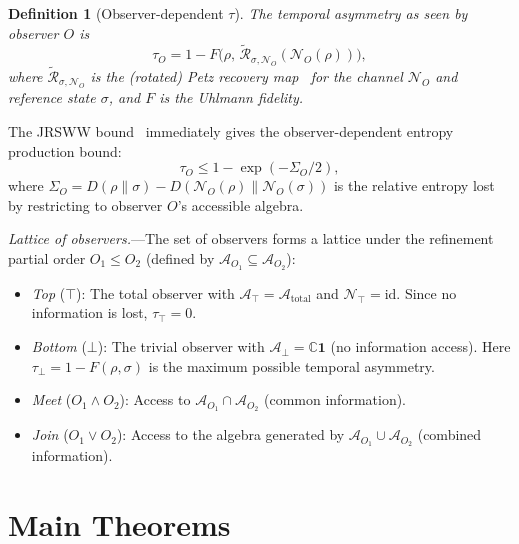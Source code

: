 \documentclass[prl,twocolumn,superscriptaddress,longbibliography,floatfix]{revtex4-2}
\newtheorem{definition}{Definition}
\newcommand{\id}{\mathrm{id}}
\newcommand{\Petz}{\mathcal{R}}
\newcommand{\chan}{\mathcal{N}}
\newcommand{\tauasym}{\tau}
\newcommand{\algO}{\mathcal{A}}
\begin{document}
\begin{definition}[Observer-dependent $\tauasym$]
\label{def:tau}
The \emph{temporal asymmetry as seen by observer $O$} is
\begin{equation}
\tauasym_O = 1 - F\!\big(\rho,\,
  \tilde{\Petz}_{\sigma,\chan_O}(\chan_O(\rho))\big),
\label{eq:tau_O}
\end{equation}
where $\tilde{\Petz}_{\sigma,\chan_O}$ is the (rotated) Petz
recovery map~\cite{Petz1988,Junge2018} for the channel $\chan_O$ and
reference state $\sigma$, and $F$ is the Uhlmann fidelity.
\end{definition}

The JRSWW bound~\cite{Junge2018} immediately gives the
observer-dependent entropy production bound:
\begin{equation}
\tauasym_O \leq 1 - \exp(-\Sigma_O/2),
\label{eq:tau_bound}
\end{equation}
where
$\Sigma_O = D(\rho\|\sigma) - D(\chan_O(\rho)\|\chan_O(\sigma))$
is the relative entropy lost by restricting to observer $O$'s
accessible algebra.

\emph{Lattice of observers.}---The set of observers forms a
lattice under the refinement partial order $O_1 \leq O_2$
(defined by $\algO_{O_1} \subseteq \algO_{O_2}$):
\begin{itemize}
\item \emph{Top} ($\top$): The total observer with
  $\algO_\top = \algO_{\mathrm{total}}$ and $\chan_\top = \id$.
  Since no information is lost, $\tauasym_\top = 0$.
\item \emph{Bottom} ($\bot$): The trivial observer with
  $\algO_\bot = \mathbb{C}\mathbf{1}$ (no information access).
  Here $\tauasym_\bot = 1 - F(\rho, \sigma)$ is the maximum
  possible temporal asymmetry.
\item \emph{Meet} ($O_1 \wedge O_2$): Access to
  $\algO_{O_1} \cap \algO_{O_2}$ (common information).
\item \emph{Join} ($O_1 \vee O_2$): Access to the algebra
  generated by $\algO_{O_1} \cup \algO_{O_2}$ (combined
  information).
\end{itemize}

\section{Main Theorems}
\label{sec:theorems}
\end{document}
